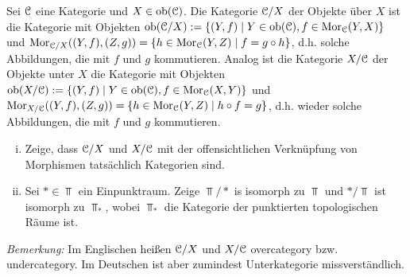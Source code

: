 \begin{aufgabe}
	Sei $\mathcal C$ eine Kategorie und $X\in\textrm{ob}(\mathcal C)$. Die Kategorie $\mathcal C/X$ der Objekte über $X$ ist die Kategorie mit Objekten $\textrm{ob}(\mathcal C/X):=\{(Y,f)\mid Y\in\textrm{ob}(\mathcal C),f\in\operatorname{Mor}_\mathcal C(Y,X)\}$ und $\operatorname{Mor}_{\mathcal C/X}((Y,f),(Z,g))=\{h\in\operatorname{Mor}_\mathcal C(Y,Z)\mid f=g\circ h\}$, d.h. solche Abbildungen, die mit $f$ und $g$ kommutieren.  Analog ist die Kategorie $X/\mathcal C$ der Objekte unter $X$ die Kategorie mit Objekten $\textrm{ob}(X/\mathcal C):=\{(Y,f)\mid Y\in\textrm{ob}(\mathcal C),f\in\operatorname{Mor}_\mathcal C(X,Y)\}$ und $\operatorname{Mor}_{X/\mathcal C}((Y,f),(Z,g))=\{h\in\operatorname{Mor}_\mathcal C(Y,Z)\mid h\circ f=g\}$, d.h. wieder solche Abbildungen, die mit $f$ und $g$ kommutieren. 
	\begin{enumerate}[(i)]
		\item Zeige, dass $\mathcal C/X$ und $X/\mathcal C$ mit der offensichtlichen Verknüpfung von Morphismen tatsächlich Kategorien sind.
		\item Sei $*\in\Top$ ein Einpunktraum. Zeige $\Top/*$ is isomorph zu $\Top$ und $*/\Top$ ist isomorph zu $\Top_*$, wobei $\Top_*$ die Kategorie der punktierten topologischen Räume ist.
	\end{enumerate}
\emph{Bemerkung:} Im Englischen heißen $\mathcal C/X$ und $X/\mathcal C$ overcategory bzw. undercategory. Im Deutschen ist aber zumindest Unterkategorie missverständlich.
\end{aufgabe}


